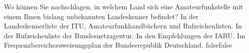     {Wo können Sie nachschlagen, in welchem Land sich eine Amateurfunkstelle mit einem Ihnen bislang unbekannten Landeskenner befindet?}
    {In der Landeskennerliste der ITU, Amateurfunkhandbüchern und Rufzeichenlisten.}
    {In der Rufzeichenliste der Bundesnetzagentur.}
    {In den Empfehlungen der IARU.}
    {Im Frequenzbereichszuweisungsplan der Bundesrepublik Deutschland.}
    {false}{false}